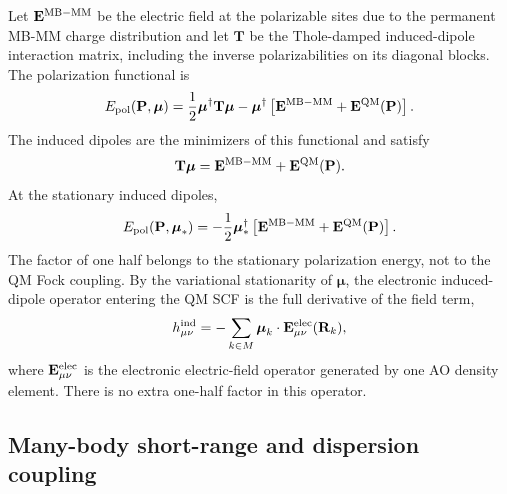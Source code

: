 \documentclass[11pt]{article}
\begin{document}
Let $\mathbf{E}^{\rm MB-MM}$ be the electric field at the polarizable
sites due to the permanent MB-MM charge distribution and let $\mathbf{T}$
be the Thole-damped induced-dipole interaction matrix, including the
inverse polarizabilities on its diagonal blocks. The polarization
functional is
\begin{equation}
  E_{\rm pol}(\mathbf{P},\boldsymbol{\mu})
  =
  \frac{1}{2}\boldsymbol{\mu}^{\dagger}\mathbf{T}\boldsymbol{\mu}
  -
  \boldsymbol{\mu}^{\dagger}
  \left[
    \mathbf{E}^{\rm MB-MM}
    + \mathbf{E}^{\rm QM}(\mathbf{P})
  \right].
  \label{eq:qmmm_pol_functional}
\end{equation}
The induced dipoles are the minimizers of this functional and satisfy
\begin{equation}
  \mathbf{T}\boldsymbol{\mu}
  =
  \mathbf{E}^{\rm MB-MM}
  + \mathbf{E}^{\rm QM}(\mathbf{P}).
  \label{eq:qmmm_induced_dipoles}
\end{equation}
At the stationary induced dipoles,
\begin{equation}
  E_{\rm pol}(\mathbf{P},\boldsymbol{\mu}_*)
  =
  -\frac{1}{2}
  \boldsymbol{\mu}_*^{\dagger}
  \left[
    \mathbf{E}^{\rm MB-MM}
    + \mathbf{E}^{\rm QM}(\mathbf{P})
  \right].
  \label{eq:qmmm_pol_minimized}
\end{equation}
The factor of one half belongs to the stationary polarization energy, not
to the QM Fock coupling. By the variational stationarity of
$\boldsymbol{\mu}$, the electronic induced-dipole operator entering the QM
SCF is the full derivative of the field term,
\begin{equation}
  h_{\mu\nu}^{\rm ind}
  =
  -\sum_{k\in M}\boldsymbol{\mu}_k\cdot
  \mathbf{E}_{\mu\nu}^{\rm elec}(\mathbf{R}_k),
  \label{eq:qmmm_ind_operator}
\end{equation}
where $\mathbf{E}_{\mu\nu}^{\rm elec}$ is the electronic electric-field
operator generated by one AO density element. There is no extra one-half
factor in this operator.

\subsection{Many-body short-range and dispersion coupling}
\end{document}
